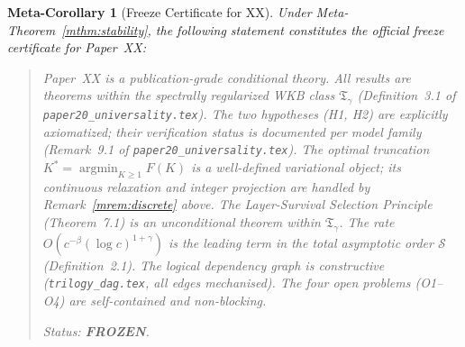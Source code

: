 \documentclass[12pt,a4paper]{amsart}
\newtheorem{metacorollary}[metatheorem]{Meta-Corollary}
\theoremstyle{definition}
\begin{document}
\begin{metacorollary}[Freeze Certificate for XX]
\label{mcor:freeze}
Under Meta-Theorem~\ref{mthm:stability},
the following statement constitutes the
\emph{official freeze certificate for Paper~XX}:

\medskip
\begin{quote}\itshape
Paper~XX is a publication-grade conditional theory.
All results are theorems within the spectrally
regularized WKB class $\mathfrak{T}_\gamma$
(Definition~3.1 of \texttt{paper20\_universality.tex}).
The two hypotheses (H1, H2) are
explicitly axiomatized; their verification status
is documented per model family
(Remark~9.1 of \texttt{paper20\_universality.tex}).
The optimal truncation $K^* = \operatorname{argmin}_{K\geq 1} F(K)$
is a well-defined variational object;
its continuous relaxation and integer projection
are handled by Remark~\ref{mrem:discrete} above.
The Layer-Survival Selection Principle
(Theorem~7.1) is an unconditional theorem
within $\mathfrak{T}_\gamma$.
The rate $O(c^{-\beta}(\log c)^{1+\gamma})$
is the leading term in the total asymptotic
order $\mathcal{S}$ (Definition~2.1).
The logical dependency graph is constructive
(\texttt{trilogy\_dag.tex}, all edges mechanised).
The four open problems (O1--O4) are
self-contained and non-blocking.

\medskip
Status: \textbf{FROZEN}.
\end{quote}
\end{metacorollary}
\end{document}
